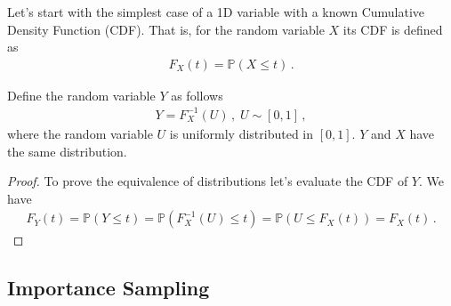 Let's start with the simplest case of a 1D variable with a known Cumulative Density Function (CDF).
That is, for the random variable $X$ its CDF is defined as
\begin{align}
    F_X(t) = \mathbb{P}(X \leq t)\,.
\end{align}
\begin{proposition}
    Define the random variable $Y$ as follows
    \begin{align}
        Y = F_X^{-1}(U)\,,\; U \sim [0,1]\,,
    \end{align}
    where the random variable $U$ is uniformly distributed in $[0,1]$.
    $Y$ and $X$ have the same distribution.
\end{proposition}
\begin{proof}
    To prove the equivalence of distributions let's evaluate the CDF of $Y$.
    We have
    \begin{align}
        F_Y(t) = \mathbb{P}(Y \leq t) = \mathbb{P}(F_X^{-1}(U) \leq t) = \mathbb{P}(U \leq F_X(t)) = F_X(t)\,.
    \end{align}
\end{proof}

\subsection{Importance Sampling}


